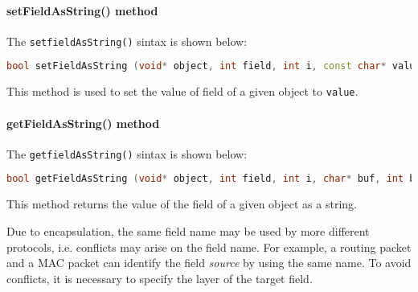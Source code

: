 \paragraph{setFieldAsString() method}
The \texttt{setfieldAsString()} sintax is shown below:
%
\begin{lstlisting}[language={cpp}]
bool setFieldAsString (void* object, int field, int i, const char* value);
\end{lstlisting}
%
This method is used to set the value of field of a given object to \texttt{value}. 

\paragraph{getFieldAsString() method}
The \texttt{getfieldAsString()} sintax is shown below:
%
\begin{lstlisting}[language={cpp}]
bool getFieldAsString (void* object, int field, int i, char* buf, int bufsize);
\end{lstlisting}
%
This method returns the value of the field of a given object as a string.

Due to encapsulation, the same field name may be used by more different protocols, i.e. conflicts may arise on the field name. For example, a routing packet and a MAC packet can identify the field \emph{source} by using the same name. To avoid conflicts, it is necessary to specify the layer of the target field.

\iffalse
So when we work on a MAC packet and we have to change or retrieve a routing field, our method search the correct packet identified by the \texttt{layer} and than use his class descriptor to change or retrieve the field's value.
\fi


